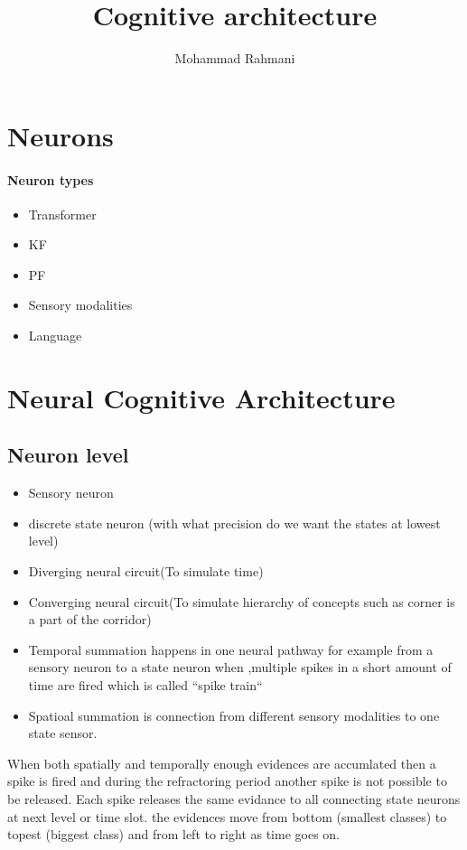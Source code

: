 \documentclass[a4paper]{article}
\title{Cognitive architecture}
\date{}
\author{Mohammad Rahmani}
\begin{document}
    \maketitle
    
    
    \section{Neurons}
        
        \paragraph{Neuron types}
            \begin{itemize}
                \item Transformer
                \item KF
                \item PF
                \item Sensory modalities
                \item Language
            \end{itemize}
            
    
    
    \section{Neural Cognitive Architecture}\label{neural_cognitive_architecture}
    
    \subsection{Neuron level}
        \begin{itemize}
            \item Sensory neuron
            \item discrete state neuron (with what precision do we want the states at lowest level)
            \item Diverging neural circuit(To simulate time)
            \item Converging neural circuit(To simulate hierarchy of concepts such as corner is a part of the corridor)
            \item Temporal summation happens in one neural pathway for example from a sensory neuron to a state neuron when ,multiple spikes in a short amount of time are fired which is called ``spike train``
            \item Spatioal summation is connection from different sensory modalities to one state sensor.
        \end{itemize}
        
        When both spatially and temporally enough evidences are accumlated then a spike is fired and during the refractoring period another spike is not possible to be released. Each spike releases the same evidance to all connecting state neurons at next level or time slot. the evidences move from bottom (smallest classes) to topest (biggest class) and from left to right as time goes on.
        
        
        
        
        
\end{document}
